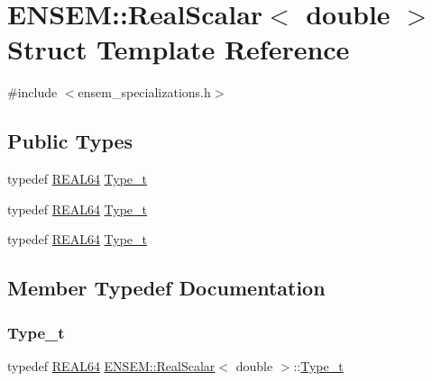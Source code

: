 \hypertarget{structENSEM_1_1RealScalar_3_01double_01_4}{}\section{E\+N\+S\+EM\+:\+:Real\+Scalar$<$ double $>$ Struct Template Reference}
\label{structENSEM_1_1RealScalar_3_01double_01_4}


{\ttfamily \#include $<$ensem\+\_\+specializations.\+h$>$}

\subsection*{Public Types}
\begin{DoxyCompactItemize}
\item 
typedef \mbox{\hyperlink{namespaceENSEM_a85b215b9f1f43715aebee01718e25082}{R\+E\+A\+L64}} \mbox{\hyperlink{structENSEM_1_1RealScalar_3_01double_01_4_a15549d5ed238882861151026df8e74b3}{Type\+\_\+t}}
\item 
typedef \mbox{\hyperlink{namespaceENSEM_a85b215b9f1f43715aebee01718e25082}{R\+E\+A\+L64}} \mbox{\hyperlink{structENSEM_1_1RealScalar_3_01double_01_4_a15549d5ed238882861151026df8e74b3}{Type\+\_\+t}}
\item 
typedef \mbox{\hyperlink{namespaceENSEM_a85b215b9f1f43715aebee01718e25082}{R\+E\+A\+L64}} \mbox{\hyperlink{structENSEM_1_1RealScalar_3_01double_01_4_a15549d5ed238882861151026df8e74b3}{Type\+\_\+t}}
\end{DoxyCompactItemize}


\subsection{Member Typedef Documentation}
\mbox{\label{structENSEM_1_1RealScalar_3_01double_01_4_a15549d5ed238882861151026df8e74b3}} 
\subsubsection{\texorpdfstring{Type\_t}{Type\_t}\hspace{0.1cm}{\footnotesize\ttfamily [1/3]}}
{\footnotesize\ttfamily typedef \mbox{\hyperlink{namespaceENSEM_a85b215b9f1f43715aebee01718e25082}{R\+E\+A\+L64}} \mbox{\hyperlink{structENSEM_1_1RealScalar}{E\+N\+S\+E\+M\+::\+Real\+Scalar}}$<$ double $>$\+::\mbox{\hyperlink{structENSEM_1_1RealScalar_3_01double_01_4_a15549d5ed238882861151026df8e74b3}{Type\+\_\+t}}}

